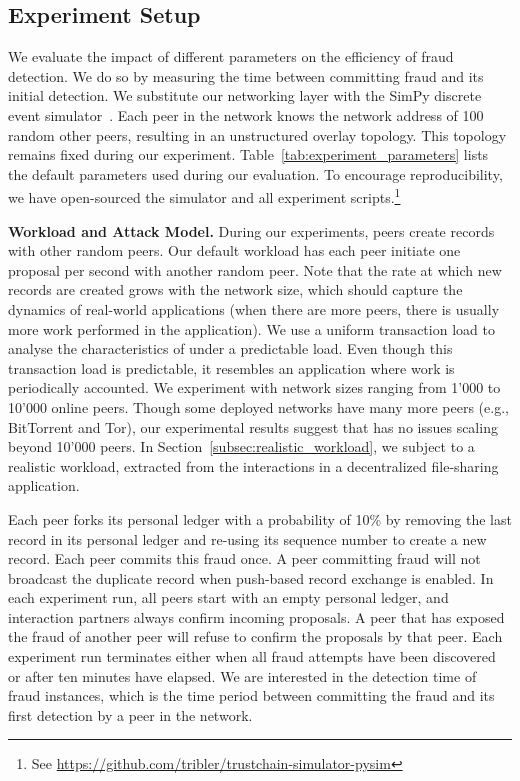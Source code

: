 \subsection{Experiment Setup}
We evaluate the impact of different parameters on the efficiency of fraud detection.
We do so by measuring the time between committing fraud and its initial detection.
We substitute our networking layer with the SimPy discrete event simulator~\cite{matloff2008introduction}.
Each peer in the \TrustChain{} network knows the network address of 100 random other peers, resulting in an unstructured overlay topology.
This topology remains fixed during our experiment.
Table~\ref{tab:experiment_parameters} lists the default parameters used during our evaluation.
To encourage reproducibility, we have open-sourced the \TrustChain{} simulator and all experiment scripts.\footnote{See \url{https://github.com/tribler/trustchain-simulator-pysim}}

\textbf{Workload and Attack Model.}
During our experiments, peers create records with other random peers.
Our default workload has each peer initiate one proposal per second with another random peer.
Note that the rate at which new records are created grows with the network size, which should capture the dynamics of real-world applications (when there are more peers, there is usually more work performed in the application).
We use a uniform transaction load to analyse the characteristics of \TrustChain{} under a predictable load.
Even though this transaction load is predictable, it resembles an application where work is periodically accounted.
We experiment with network sizes ranging from 1'000 to 10'000 online peers.
Though some deployed networks have many more peers (e.g., BitTorrent and Tor), our experimental results suggest that \TrustChain{} has no issues scaling beyond 10'000 peers.
In Section~\ref{subsec:realistic_workload}, we subject \TrustChain{} to a realistic workload, extracted from the interactions in a decentralized file-sharing application.

Each peer forks its personal ledger with a probability of 10\% by removing the last record in its personal ledger and re-using its sequence number to create a new record.
Each peer commits this fraud once.
A peer committing fraud will not broadcast the duplicate record when push-based record exchange is enabled.
In each experiment run, all peers start with an empty personal ledger, and interaction partners always confirm incoming proposals.
A peer that has exposed the fraud of another peer will refuse to confirm the proposals by that peer.
Each experiment run terminates either when all fraud attempts have been discovered or after ten minutes have elapsed.
We are interested in the detection time of fraud instances, which is the time period between committing the fraud and its first detection by a peer in the network.

